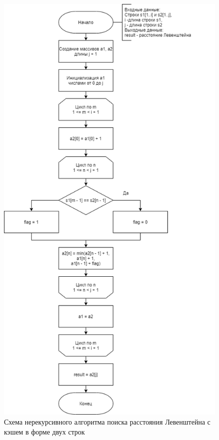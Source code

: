 \newpage 
\begin{figure}[H]
	\begin{center}
		\includegraphics[scale=0.6]{assets/LevCacheTwoRows.png}
	\end{center}
	\caption{Схема нерекурсивного алгоритма поиска расстояния Левенштейна с кэшем в форме двух строк}
\end{figure}

